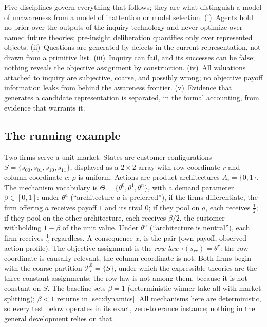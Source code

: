 Five disciplines govern everything that follows; they are what distinguish a
model of unawareness from a model of inattention or model selection.
(i)~Agents hold no prior over the outputs of the inquiry technology and never
optimize over named future theories; pre-insight deliberation quantifies only
over represented objects.  (ii)~Questions are generated by defects in the
current representation, not drawn from a primitive list.  (iii)~Inquiry can
fail, and its successes can be false; nothing reveals the objective
assignment by construction.  (iv)~All valuations attached to inquiry are
subjective, coarse, and possibly wrong; no objective payoff information
leaks from behind the awareness frontier.  (v)~Evidence that generates a
candidate representation is separated, in the formal accounting, from
evidence that warrants it.

\subsection{The running example}

\begin{example}
\label{ex:setup}
Two firms serve a unit market.  States are customer configurations
$S=\{s_{00},s_{01},s_{10},s_{11}\}$, displayed as a $2\times2$ array with row
coordinate $r$ and column coordinate $c$; $\rho$ is uniform.  Actions are
product architectures $A_i=\{0,1\}$.  The mechanism vocabulary is
$\Theta=\{\theta^0,\theta^1,\theta^n\}$, with a demand parameter
$\beta\in[0,1]$: under $\theta^a$ (``architecture $a$ is preferred''), if the
firms differentiate, the firm offering $a$ receives payoff $1$ and its rival
$0$; if they pool on $a$, each receives $\tfrac12$; if they pool on the other
architecture, each receives $\beta/2$, the customer withholding $1-\beta$ of
the unit value.  Under $\theta^n$ (``architecture is neutral''), each firm
receives $\tfrac12$ regardless.  A consequence $x_i$ is the pair (own payoff,
observed action profile).  The objective assignment is the \emph{row law}
$\tau(s_{rc})=\theta^{r}$: the row coordinate is causally relevant, the
column coordinate is not.  Both firms begin with the coarse partition
$\mathcal P_i^0=\{S\}$, under which the expressible theories are the three
constant assignments; the row law is not among them, because it is not
constant on $S$.  The baseline sets $\beta=1$ (deterministic winner-take-all
with market splitting); $\beta<1$ returns in \cref{sec:dynamics}.  All
mechanisms here are deterministic, so every test below operates in its exact,
zero-tolerance instance; nothing in the general development relies on that.
\end{example}
